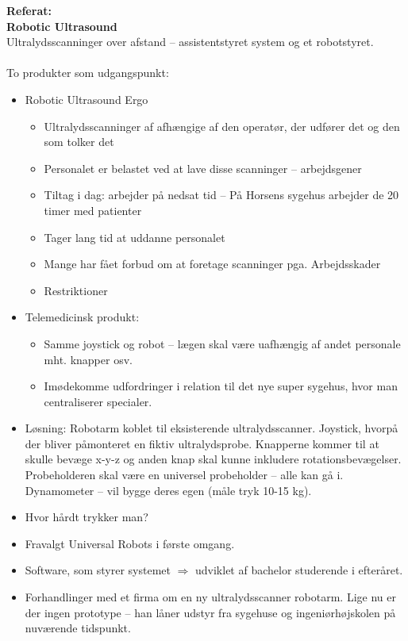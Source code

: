 \textbf{Referat:}\\
\textbf{Robotic Ultrasound}\\
Ultralydsscanninger over afstand – assistentstyret system og et robotstyret. \\\\
To produkter som udgangspunkt:
\begin{itemize}
\item Robotic Ultrasound Ergo
	\begin{itemize}
	\item Ultralydsscanninger af afhængige af den operatør, der udfører det og den som tolker det
	\item Personalet er belastet ved at lave disse scanninger – arbejdsgener
	\item Tiltag i dag: arbejder på nedsat tid – På Horsens sygehus arbejder de 20 timer med patienter
	\item Tager lang tid at uddanne personalet
	\item Mange har fået forbud om at foretage scanninger pga. Arbejdsskader
	\item Restriktioner
	\end{itemize}
\item Telemedicinsk produkt: 
	\begin{itemize}
	\item Samme joystick og robot – lægen skal være uafhængig af andet personale mht. knapper osv. 
	\item Imødekomme udfordringer i relation til det nye super sygehus, hvor man centraliserer specialer. 
	\end{itemize}
\end{itemize}
\begin{itemize}
\item Løsning: Robotarm koblet til eksisterende ultralydsscanner. Joystick, hvorpå der bliver påmonteret en fiktiv ultralydsprobe. Knapperne kommer til at skulle bevæge x-y-z og anden knap skal kunne inkludere rotationsbevægelser. Probeholderen skal være en universel probeholder – alle kan gå i. Dynamometer – vil bygge deres egen (måle tryk 10-15 kg). 
\item Hvor hårdt trykker man? 
\item Fravalgt Universal Robots i første omgang.
\item Software, som styrer systemet $\Rightarrow$ udviklet af bachelor studerende i efteråret. 
\item Forhandlinger med et firma om en ny ultralydsscanner robotarm. Lige nu er der ingen prototype – han låner udstyr fra sygehuse og ingeniørhøjskolen på nuværende tidspunkt.
\end{itemize}
